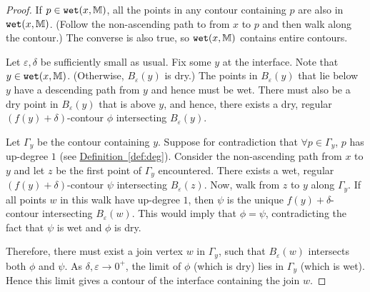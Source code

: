 \documentclass[11pt]{article}
\theoremstyle{definition}
\newcommand{\MM}{\mathbb{M}}
\newcommand{\eps}{\varepsilon}
\newcommand{\Def}[1]{\hyperref[def:#1]{Definition~\ref*{def:#1}}} %
\newcommand{\wet}{{\tt wet}}
\begin{document}
\begin{proof} If $p \in \wet(x,\MM)$, all the points in any contour containing $p$ are also in $\wet(x,\MM)$.
 (Follow the non-ascending path to from $x$ to $p$ and then walk along the contour.) The converse is also true,
 so $\wet(x,\MM)$ contains entire contours.

Let $\eps, \delta$ be sufficiently small as usual. Fix some $y$ at the interface.
Note that $y \in \wet(x,\MM)$. (Otherwise, $B_\eps(y)$ is dry.)
The points in $B_\eps(y)$ that lie below $y$ have a descending path from $y$ and hence must be wet.
There must also be a dry point in $B_\eps(y)$ that is above $y$, and hence,
there exists a dry, regular $(f(y)+\delta)$-contour $\phi$ intersecting $B_\eps(y)$.

Let $\Gamma_y$ be the contour containing $y$.  Suppose for contradiction
that $\forall p \in \Gamma_y$, $p$ has up-degree $1$ (see \Def{deg}). Consider the non-ascending path from $x$ to $y$ and let $z$
be the first point of $\Gamma_y$ encountered. There exists a wet, regular $(f(y) + \delta)$-contour $\psi$ 
intersecting $B_\eps(z)$. Now, walk from $z$ to $y$ along $\Gamma_y$. If all points $w$ in this walk
have up-degree $1$, then $\psi$ is the unique $f(y)+\delta$-contour
intersecting $B_\eps(w)$. This would imply that $\phi = \psi$, contradicting the fact that $\psi$ is wet
and $\phi$ is dry.

Therefore, there must exist a join vertex $w$ in $\Gamma_y$, such that $B_\eps(w)$ intersects
both $\phi$ and $\psi$. As $\delta, \eps \rightarrow 0^+$, the limit of $\phi$ (which is dry)
lies in $\Gamma_y$ (which is wet). 
Hence this limit gives a contour of the interface containing the join $w$.
\end{proof}
\end{document}
